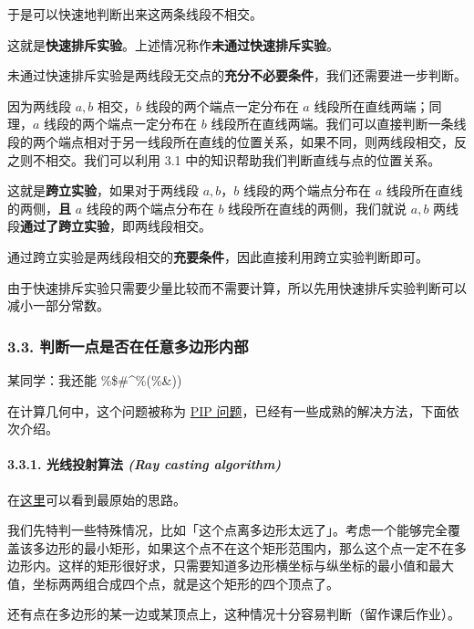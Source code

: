 于是可以快速地判断出来这两条线段不相交。

这就是\textbf{快速排斥实验}。上述情况称作\textbf{未通过快速排斥实验}。

未通过快速排斥实验是两线段无交点的\textbf{充分不必要条件}，我们还需要进一步判断。

因为两线段 $a,b$ 相交，$b$ 线段的两个端点一定分布在 $a$ 线段所在直线两端；同理，$a$ 线段的两个端点一定分布在 $b$ 线段所在直线两端。我们可以直接判断一条线段的两个端点相对于另一线段所在直线的位置关系，如果不同，则两线段相交，反之则不相交。我们可以利用 3.1 中的知识帮助我们判断直线与点的位置关系。

这就是\textbf{跨立实验}，如果对于两线段 $a,b$，$b$ 线段的两个端点分布在 $a$ 线段所在直线的两侧，\textbf{且} $a$ 线段的两个端点分布在 $b$ 线段所在直线的两侧，我们就说 $a,b$ 两线段\textbf{通过了跨立实验}，即两线段相交。

通过跨立实验是两线段相交的\textbf{充要条件}，因此直接利用跨立实验判断即可。

由于快速排斥实验只需要少量比较而不需要计算，所以先用快速排斥实验判断可以减小一部分常数。

\subsubsection{3.3. 判断一点是否在任意多边形内部}

\begin{QUOTE}{}{}
某同学：我还能 \%\$\#\textasciicircum{}\%(\%\&))
\end{QUOTE}

在计算几何中，这个问题被称为 \href{https://en.wikipedia.org/wiki/Point_in_polygon}{PIP 问题}，已经有一些成熟的解决方法，下面依次介绍。

\paragraph{3.3.1. 光线投射算法 {\em (Ray casting algorithm) }}

在\href{https://wrf.ecse.rpi.edu//Research/Short_Notes/pnpoly.html}{这里}可以看到最原始的思路。

我们先特判一些特殊情况，比如「这个点离多边形太远了」。考虑一个能够完全覆盖该多边形的最小矩形，如果这个点不在这个矩形范围内，那么这个点一定不在多边形内。这样的矩形很好求，只需要知道多边形横坐标与纵坐标的最小值和最大值，坐标两两组合成四个点，就是这个矩形的四个顶点了。

还有点在多边形的某一边或某顶点上，这种情况十分容易判断（留作课后作业）。


